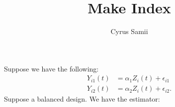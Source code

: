 \documentclass[12pt]{article}
\author{Cyrus Samii}
\title{Make Index}
\date{}
\newcommand{\0}{\mathbf{0}}
\begin{document}
\maketitle


Suppose we have the following:
\begin{align*}
Y_{i1}(t)& = \alpha_1 Z_i(t) + \epsilon_{i1} \\
Y_{i2}(t)& = \alpha_2 Z_i(t) + \epsilon_{i2} .
\end{align*}
Suppose a balanced design.  We have the estimator:
$$
\frac{}{}
$$
\end{document}
